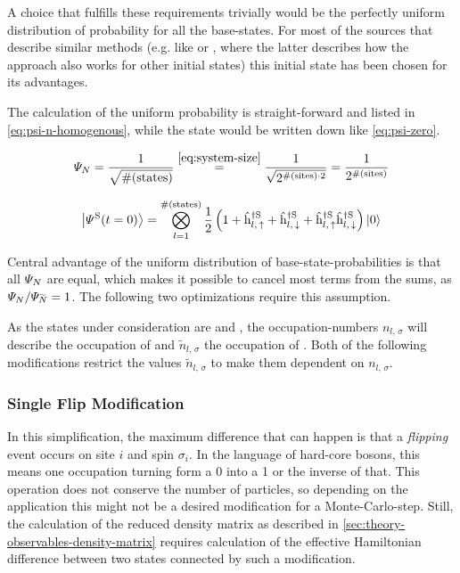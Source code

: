 A choice that fulfills these requirements trivially would be the perfectly uniform distribution of probability for all the base-states.
For most of the sources that describe similar methods (e.g. like \cite{isingDynamicsWithClassicalNetworks} or \cite{variationalClassicalNetworksPaper}, where the latter describes how the approach also works for other initial states) this initial state has been chosen for its advantages.

The calculation of the uniform probability is straight-forward and listed in \autoref{eq:psi-n-homogenous}, while the state would be written down like \autoref{eq:psi-zero}.

\begin{equation}
    \label{eq:psi-n-homogenous}
    \psiN{} = \frac{1}{\sqrt{\text{\#}(\text{states})}} \stackrel{\ref{eq:system-size}}{=} \frac{1}{\sqrt{2^{\text{\#}(\text{sites}) \cdot 2}}} = \frac{1}{2^{\text{\#}(\text{sites})}}
\end{equation}

\begin{equation}
    \label{eq:psi-zero}
    \ketpsiof[\schroedingerPicture]{t=0} = \bigotimes\limits_{l=1}^{\text{\#}(\text{states})} \frac{1}{2} \left( 1 + \withspinhcop[\schroedingerPicture]{l}{\up}{\dagger} + \withspinhcop[\schroedingerPicture]{l}{\down}{\dagger} + \withspinhcop[\schroedingerPicture]{l}{\up}{\dagger}  \withspinhcop[\schroedingerPicture]{l}{\down}{\dagger} \right) \ketN[0]
\end{equation}

Central advantage of the uniform distribution of base-state-probabilities is that all $\varPsi_{N}$ are equal, which makes it possible to cancel most terms from the sums, as $\psiN{}/\psiN[\vphantom{N}\smash{\tilde{N}}]{} = 1$.
The following two optimizations require this assumption.

As the states under consideration are \ketN[N] and , the occupation-numbers $n_{l,\,\sigma}$ will describe the occupation of \ketN[N] and $\tilde{n}_{l,\,\sigma}$ the occupation of .
Both of the following modifications restrict the values $\tilde{n}_{l,\,\sigma}$ to make them dependent on $n_{l,\,\sigma}$.

\subsubsection*{Single Flip Modification}

In this simplification, the maximum difference that can happen is that a \emph{flipping} event occurs on site $i$ and spin $\sigma_i$. 
In the language of hard-core bosons, this means one occupation turning form a 0 into a 1 or the inverse of that.
This operation does not conserve the number of particles, so depending on the application this might not be a desired modification for a Monte-Carlo-step.
Still, the calculation of the reduced density matrix as described in \autoref{sec:theory-observables-density-matrix} requires calculation of the effective Hamiltonian difference between two states connected by such a modification.

